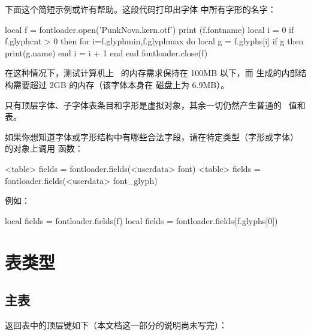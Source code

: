 下面这个简短示例或许有帮助。这段代码打印出字体 
中所有字形的名字：

\begin{typing}
local f = fontloader.open('PunkNova.kern.otf')
print (f.fontname)
local i = 0
if f.glyphcnt > 0 then
    for i=f.glyphmin,f.glyphmax do
       local g = f.glyphs[i]
       if g then
          print(g.name)
       end
       i = i + 1
    end
end
fontloader.close(f)
\end{typing}

在这种情况下，测试计算机上 \LUATEX\ 的内存需求保持在 100MB 以下，而
 生成的内部结构需要超过 2GB 的内存（该字体本身在
磁盘上为 6.9MB）。

只有顶层字体、子字体表条目和字形是虚拟对象，其余一切仍然产生普通的
\LUA\ 值和表。

如果你想知道字体或字形结构中有哪些合法字段，请在特定类型（字形或字体）
的对象上调用  函数：

\begin{typing}
<table> fields = fontloader.fields(<userdata> font)
<table> fields = fontloader.fields(<userdata> font_glyph)
\end{typing}

例如：

\begin{typing}
local fields = fontloader.fields(f)
local fields = fontloader.fields(f.glyphs[0])
\end{typing}

\section{表类型}

\subsection{主表}

返回表中的顶层键如下（本文档这一部分的说明尚未写完）：

